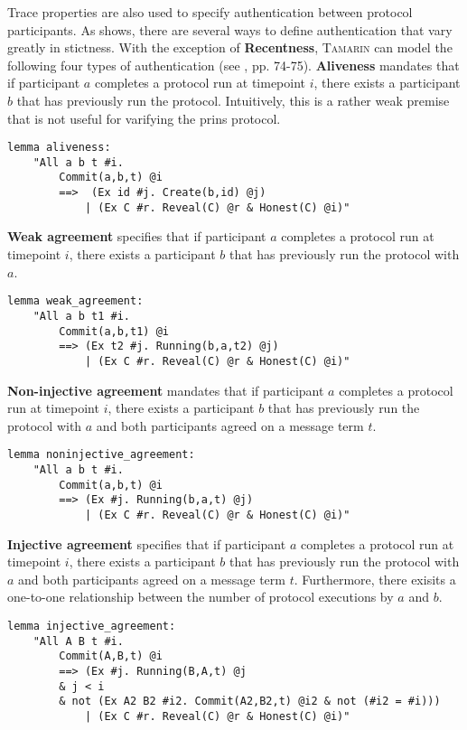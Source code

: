 Trace properties are also used to specify authentication between protocol participants.
As \cite{lowe1997hierarchy} shows, there are several ways to define authentication that vary greatly in stictness.
With the exception of \textbf{Recentness}, \textsc{Tamarin} can model the following four types of authentication (see \cite{tamarin2019manual}, pp. 74-75).
\textbf{Aliveness} mandates that if participant $a$ completes a protocol run at timepoint $i$, there exists a participant $b$ that has previously run the protocol.
Intuitively, this is a rather weak premise that is not useful for varifying the \gls{prins} protocol.

\begin{lstlisting}
lemma aliveness:
    "All a b t #i.
        Commit(a,b,t) @i
        ==>  (Ex id #j. Create(b,id) @j)
            | (Ex C #r. Reveal(C) @r & Honest(C) @i)"
\end{lstlisting}

\textbf{Weak agreement} specifies that if participant $a$ completes a protocol run at timepoint $i$, there exists a participant $b$ that has previously run the protocol with $a$.

\begin{lstlisting}
lemma weak_agreement:
    "All a b t1 #i. 
        Commit(a,b,t1) @i
        ==> (Ex t2 #j. Running(b,a,t2) @j)
            | (Ex C #r. Reveal(C) @r & Honest(C) @i)"
\end{lstlisting}

\textbf{Non-injective agreement} mandates that if participant $a$ completes a protocol run at timepoint $i$, there exists a participant $b$ that has previously run the protocol with $a$ and both participants agreed on a message term $t$.

\begin{lstlisting}
lemma noninjective_agreement:
    "All a b t #i. 
        Commit(a,b,t) @i
        ==> (Ex #j. Running(b,a,t) @j)
            | (Ex C #r. Reveal(C) @r & Honest(C) @i)"
\end{lstlisting}

\textbf{Injective agreement} specifies that if participant $a$ completes a protocol run at timepoint $i$, there exists a participant $b$ that has previously run the protocol with $a$ and both participants agreed on a message term $t$.
Furthermore, there exisits a one-to-one relationship between the number of protocol executions by $a$ and $b$.

\begin{lstlisting}
lemma injective_agreement:
    "All A B t #i. 
        Commit(A,B,t) @i
        ==> (Ex #j. Running(B,A,t) @j
        & j < i
        & not (Ex A2 B2 #i2. Commit(A2,B2,t) @i2 & not (#i2 = #i)))
            | (Ex C #r. Reveal(C) @r & Honest(C) @i)"
\end{lstlisting}

